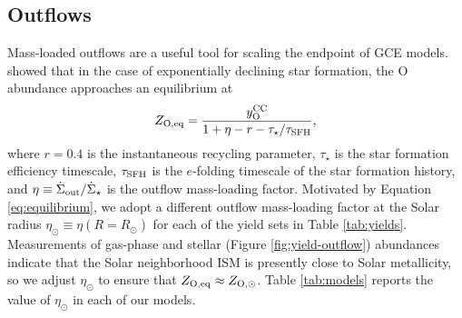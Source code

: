 \documentclass[twocolumn,twocolappendix,linenumbers]{aastex631}
\newcommand{\mathOH}{{\rm [O/H]}}
\newcommand{\yZ}[1]{$y/Z_\odot=#1$}
\begin{document}
\subsection{Outflows}
\label{sec:outflows}

Mass-loaded outflows are a useful tool for scaling the endpoint of GCE models. \citet{weinberg_equilibrium_2017} showed that in the case of exponentially declining star formation, the O abundance approaches an equilibrium at
\begin{equation}
    \label{eq:equilibrium}
    Z_{\rm O,eq} = \frac{y_{\rm O}^{\rm CC}}{1 + \eta - r - \tau_\star/\tau_{\rm SFH}},
\end{equation}
where $r=0.4$ is the instantaneous recycling parameter, $\tau_\star$ is the star formation efficiency timescale, $\tau_{\rm SFH}$ is the $e$-folding timescale of the star formation history, and $\eta\equiv \dot\Sigma_{\rm out}/\dot\Sigma_\star$ is the outflow mass-loading factor. Motivated by Equation \ref{eq:equilibrium}, we adopt a different outflow mass-loading factor at the Solar radius $\eta_\odot\equiv\eta(R=R_\odot)$ for each of the yield sets in Table \ref{tab:yields}. 
Measurements of gas-phase \citep[e.g.,][]{mendez-delgado_gradients_2022} and stellar (Figure \ref{fig:yield-outflow}) abundances indicate that the Solar neighborhood ISM is presently close to Solar metallicity, so we adjust $\eta_\odot$ to ensure that $Z_{\rm O,eq}\approx Z_{\rm O,\odot}$.
Table \ref{tab:models} reports the value of $\eta_\odot$ in each of our models.

\end{document}
